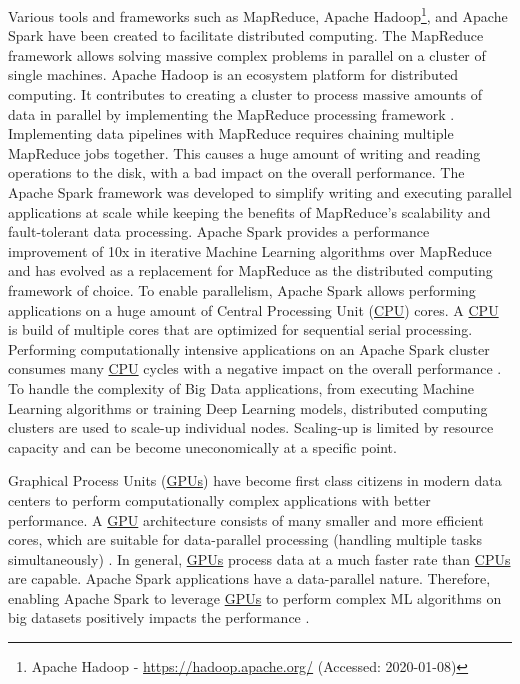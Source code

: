 Various tools and frameworks such as MapReduce\cite{Dean2004MapReduce}, Apache Hadoop\footnote{Apache Hadoop - \url{https://hadoop.apache.org/} (Accessed: 2020-01-08)}, and Apache Spark\cite{Zaharia2010Spark} have been created to facilitate distributed computing.
The MapReduce framework allows solving massive complex problems in parallel on a cluster of single machines.
Apache Hadoop is an ecosystem platform for distributed computing. It contributes to creating a cluster to process massive amounts of data in parallel by implementing the MapReduce processing framework \cite{Khattak2016BigData}.
Implementing data pipelines with MapReduce requires chaining multiple MapReduce jobs together. This causes a huge amount of writing and reading operations to the disk, with a bad impact on the overall performance. The Apache Spark framework was developed to simplify writing and executing parallel applications at scale while keeping the benefits of MapReduce's scalability and fault-tolerant data processing. Apache Spark provides a performance improvement of 10x in iterative Machine Learning algorithms over MapReduce \cite{Zaharia2010Spark} and has evolved as a replacement for MapReduce as the distributed computing framework of choice.
To enable parallelism, Apache Spark allows performing applications on a huge amount of Central Processing Unit (\hyperlink{abbr:cpu}{CPU}) cores. A \hyperlink{abbr:cpu}{CPU} is build of multiple cores that are optimized for sequential serial processing. Performing computationally intensive applications on an Apache Spark cluster consumes many \hyperlink{abbr:cpu}{CPU} cycles with a negative impact on the overall performance \cite{Li2015HeteroSpark}.
To handle the complexity of Big Data applications, from executing Machine Learning algorithms or training Deep Learning models, distributed computing clusters are used to scale-up individual nodes. Scaling-up is limited by resource capacity and can be become uneconomically at a specific point.


Graphical Process Units (\hyperlink{abbr:gpu}{GPUs}) have become first class citizens in modern data centers to perform computationally complex applications with better performance. A \hyperlink{abbr:gpu}{GPU} architecture consists of many smaller and more efficient cores, which are suitable for data-parallel processing (handling multiple tasks simultaneously) \cite{Yuan2016SparkGPU}. In general, \hyperlink{abbr:gpu}{GPUs} process data at a much faster rate than \hyperlink{abbr:cpu}{CPUs} are capable.
Apache Spark applications have a data-parallel nature. Therefore, enabling Apache Spark to leverage \hyperlink{abbr:gpu}{GPUs} to perform complex ML algorithms on big datasets positively impacts the performance \cite{Yuan2016SparkGPU}.


